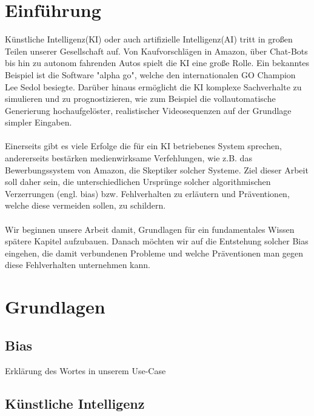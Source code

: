 \documentclass[12pt,oneside,a4paper,parskip]{scrbook}
\begin{document}
\chapter{Einführung}
\label{chapter:intro}
Künstliche Intelligenz(KI) oder auch artifizielle Intelligenz(AI) tritt in großen Teilen unserer Gesellschaft auf. Von Kaufvorschlägen in Amazon, über Chat-Bots bis hin zu autonom fahrenden Autos spielt die KI eine große Rolle. Ein bekanntes Beispiel ist die Software "alpha go", welche den internationalen GO Champion Lee Sedol besiegte\cite{alphaGo}. Darüber hinaus ermöglicht die KI komplexe Sachverhalte zu simulieren und zu prognostizieren, wie zum Beispiel die vollautomatische Generierung hochaufgelöster, realistischer Videosequenzen auf der Grundlage simpler Eingaben\cite{videoToVideo}.
\\\\
Einerseits gibt es viele Erfolge die für ein KI betriebenes System sprechen, andererseits bestärken medienwirksame Verfehlungen, wie z.B. das Bewerbungssystem von Amazon\cite{amazon}, die Skeptiker solcher Systeme. Ziel dieser Arbeit soll daher sein, die unterschiedlichen Ursprünge solcher algorithmischen Verzerrungen (engl. bias) bzw. Fehlverhalten zu erläutern und Präventionen, welche diese vermeiden sollen, zu schildern.
\\\\
Wir beginnen unsere Arbeit damit, Grundlagen für ein fundamentales Wissen spätere Kapitel aufzubauen. Danach möchten wir auf die Entstehung solcher Bias eingehen, die damit verbundenen Probleme und welche Präventionen man gegen diese Fehlverhalten unternehmen kann.

\chapter{Grundlagen}
\section{Bias}
Erklärung des Wortes in unserem Use-Case

\section{Künstliche Intelligenz}
\end{document}

